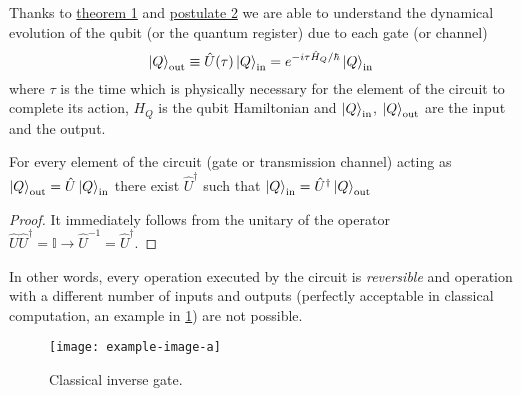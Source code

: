 Thanks to \hyperref[theorem:1]{theorem 1} and \hyperref[postulate:2]{postulate 2} we are able to understand the dynamical evolution of the qubit (or the quantum register) due to each gate (or channel)
\begin{equation}\label{eq:evolution}
     \ket{Q}_\textup{out} \equiv \hat{U}(\tau) \ket{Q}_\textup{in} = e^{-i\tau\hat{H}_Q/\hbar} \ket{Q}_\textup{in}
\end{equation}
where $\tau$ is the time which is physically necessary for the element of the circuit to complete its action, $H_Q$ is the qubit Hamiltonian and $\ket{Q}_\textup{in}$, $\ket{Q}_\textup{out}$ are the input and the output.
\begin{theorem}
For every element of the circuit (gate or transmission channel) acting as $\ket{Q}_\textup{out} = \hat{U} \ket{Q}_\textup{in}$ there exist $\hat{U}^\dagger$ such that $\ket{Q}_\textup{in} = \hat{U}^\dagger \ket{Q}_\textup{out}$
\end{theorem}
\begin{proof}
It immediately follows from the unitary of the operator $\hat{U} \hat{U}^\dagger = \mathbb{I} \rightarrow \hat{U}^{-1} = \hat{U}^\dagger$.
\end{proof}
In other words, every operation executed by the circuit is \emph{reversible} and operation with a different number of inputs and outputs (perfectly acceptable in classical computation, an example in \ref{fig:classical-inverse-gate}) are not possible.
\begin{figure}[htb]
\centering
\texttt{[image: example-image-a]}
\caption{Classical inverse gate.}
\label{fig:classical-inverse-gate}
\end{figure}
